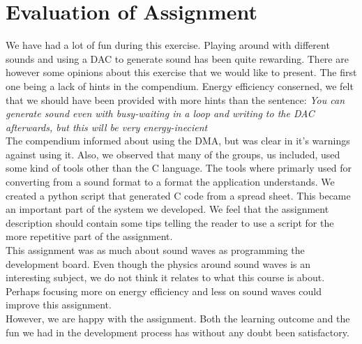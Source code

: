 \section{Evaluation of Assignment}
We have had a lot of fun during this exercise. Playing around with different sounds and using a DAC to generate sound has been quite rewarding. There are however some opinions about this exercise that we would like to present. The first one being a lack of hints in the compendium. Energy efficiency conserned, we felt that we should have been provided with more hints than the sentence:
\emph{You can generate sound even with busy-waiting in a loop and writing to the DAC afterwards, but this will be very energy-inecient}\\
The compendium informed about using the DMA, but was clear in it's warnings against using it. Also, we observed that many of the groups, us included, used some kind of tools other than the C language. The tools where primarly used for converting from a sound format to a format the application understands. We created a python script that generated C code from a spread sheet. This became an important part of the system we developed. We feel that the assignment description should contain some tips telling the reader to use a script for the more repetitive part of the assignment.\\
This assignment was as much about sound waves as programming the development board. Even though the physics around sound waves is an interesting subject, we do not think it relates to what this course is about. Perhaps focusing more on energy efficiency and less on sound waves could improve this assignment. \\
However, we are happy with the assignment. Both the learning outcome and the fun we had in the development process has without any doubt been satisfactory.
